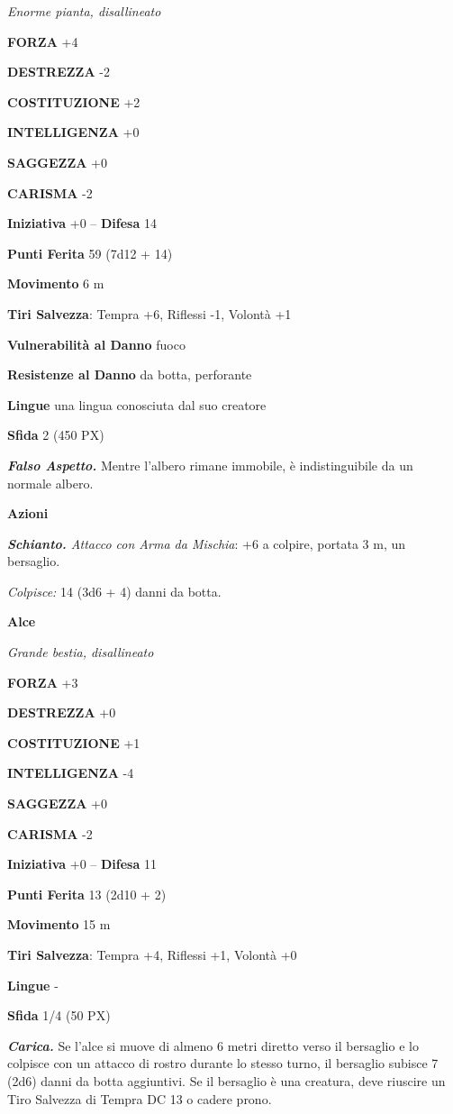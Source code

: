 \begin{multicols}{2}
\textit{Enorme pianta, disallineato}

\textbf{FORZA} +4

\textbf{DESTREZZA} -2

\textbf{COSTITUZIONE} +2

\textbf{INTELLIGENZA} +0

\textbf{SAGGEZZA} +0

\textbf{CARISMA} -2

\textbf{Iniziativa} +0 -- \textbf{Difesa} 14

\textbf{Punti Ferita} 59 (7d12 + 14)

\textbf{Movimento} 6 m

\textbf{Tiri Salvezza}: Tempra +6, Riflessi -1, Volontà +1

\textbf{Vulnerabilità al Danno} fuoco

\textbf{Resistenze al Danno} da botta, perforante

\textbf{Lingue} una lingua conosciuta dal suo creatore

\textbf{Sfida} 2 (450 PX)

\textit{\textbf{Falso Aspetto.}} Mentre l'albero rimane immobile, è indistinguibile da un normale albero.

\textbf{Azioni}

\textit{\textbf{Schianto.} Attacco con Arma da Mischia}: +6 a colpire, portata 3 m, un bersaglio.

\textit{Colpisce:} 14 (3d6 + 4) danni da botta.

\medskip\textbf{Alce}

\textit{Grande bestia, disallineato}

\textbf{FORZA} +3

\textbf{DESTREZZA} +0

\textbf{COSTITUZIONE} +1

\textbf{INTELLIGENZA} -4

\textbf{SAGGEZZA} +0

\textbf{CARISMA} -2

\textbf{Iniziativa} +0 -- \textbf{Difesa} 11

\textbf{Punti Ferita} 13 (2d10 + 2)

\textbf{Movimento} 15 m

\textbf{Tiri Salvezza}: Tempra +4, Riflessi +1, Volontà +0

\textbf{Lingue} -

\textbf{Sfida} 1/4 (50 PX)

\textit{\textbf{Carica.}} Se l'alce si muove di almeno 6 metri diretto verso il bersaglio e lo colpisce con un attacco di rostro durante lo stesso turno, il bersaglio subisce 7 (2d6) danni da botta aggiuntivi. Se il bersaglio è una creatura, deve riuscire un Tiro Salvezza di Tempra
DC 13 o cadere prono.


\end{multicols}
